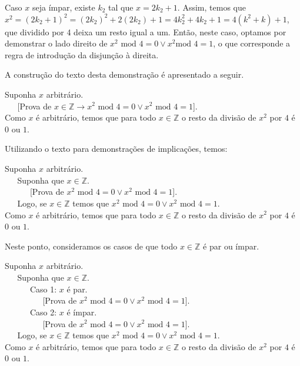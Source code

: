 \begin{Example}
Caso $x$ seja ímpar, existe $k_2$ tal que $x = 2k_2 + 1$. Assim, temos
que $x^2 = (2k_2 + 1)^2 = (2k_2)^2 + 2(2k_2) + 1 = 4k_2^2 + 4k_2 + 1 =
4(k^2 + k) + 1$, que dividido por 4 deixa um resto igual a um.
Então,
neste caso, optamos por demonstrar o lado direito de $x^2 \text{ mod } 4 = 0 \lor x^2 \text{
  mod } 4 = 1$, o que corresponde a regra de introdução da disjunção à
direita.

A construção do texto desta demonstração é apresentado a seguir.
\begin{flushleft}
Suponha $x$ arbitrário.\\
\verb|   |[Prova de $x\in\mathbb{Z}\to x^2\text{ mod }4 = 0 \lor
x^2\text{ mod }4 = 1$].\\
Como $x$ é arbitrário, temos que para todo $x\in\mathbb{Z}$ o resto da divisão de $x^2$ por $4$ é $0$
ou $1$.
\end{flushleft}
Utilizando o texto para demonstrações de implicações, temos:
\begin{flushleft}
Suponha $x$ arbitrário.\\
\verb|   |Suponha que $x\in\mathbb{Z}$.\\
\verb|      |[Prova de $x^2\text{ mod }4 = 0 \lor
x^2\text{ mod }4 = 1$].\\
\verb|   |Logo, se $x\in\mathbb{Z}$ temos que  $x^2\text{ mod }4 = 0 \lor
x^2\text{ mod }4 = 1$.\\
Como $x$ é arbitrário, temos que para todo $x\in\mathbb{Z}$ o resto da divisão de $x^2$ por $4$ é $0$
ou $1$.
\end{flushleft}
Neste ponto, consideramos os casos de que todo $x\in\mathbb{Z}$ é par
ou ímpar.
\begin{flushleft}
Suponha $x$ arbitrário.\\
\verb|   |Suponha que $x\in\mathbb{Z}$.\\
\verb|      |Caso 1: $x$ é par.\\
\verb|         |[Prova de $x^2\text{ mod }4 = 0 \lor
x^2\text{ mod }4 = 1$].\\
\verb|      |Caso 2: $x$ é ímpar.\\
\verb|         |[Prova de $x^2\text{ mod }4 = 0 \lor
x^2\text{ mod }4 = 1$].\\
\verb|   |Logo, se $x\in\mathbb{Z}$ temos que  $x^2\text{ mod }4 = 0 \lor
x^2\text{ mod }4 = 1$.\\
Como $x$ é arbitrário, temos que para todo $x\in\mathbb{Z}$ o resto da divisão de $x^2$ por $4$ é $0$
ou $1$.
\end{flushleft}


\end{Example}
